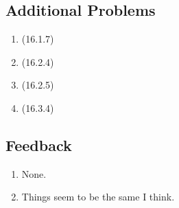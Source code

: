 \documentclass[11pt]{article}
\begin{document}
\subsection*{Additional Problems}
\begin{enumerate}
    \item (16.1.7)
    \item (16.2.4)
    \item (16.2.5)
    \item (16.3.4)
\end{enumerate}
\subsection*{Feedback}
\begin{enumerate}
    \item None.
    \item Things seem to be the same I think.
\end{enumerate}
\end{document}
